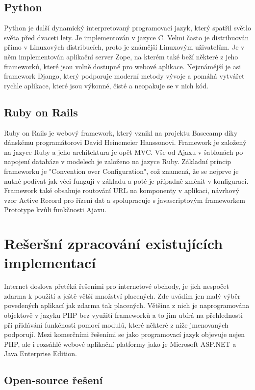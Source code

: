 \documentclass[11pt,twoside,a4paper]{book}
\begin{document}
\subsection{Python}
Python je další dynamický interpretovaný programovací jazyk, který spatřil světlo světa před dvaceti lety. Je implementován v jazyce C. Velmi často je distribuován přímo v Linuxových distribucích, proto je známější Linuxovým uživatelům. Je v něm implementován aplikační server Zope, na kterém také beží některé z jeho frameworků, které jsou volně dostupné pro webové aplikace. Nejznámější je asi framework Django, který podporuje moderní metody vývoje a pomáhá vytvářet rychle aplikace, které jsou výkonné, čisté a neopakuje se v nich kód\cite{wiki:python}.

\subsection{Ruby on Rails}
Ruby on Rails je webový framework, který vznikl na projektu Basecamp díky dánskému programátorovi David Heinemeier Hanssonovi. Framework je založený na jazyce Ruby a jeho architektura je opět MVC. Vše od Ajaxu v šablonách po napojení databáze v modelech je založeno na jazyce Ruby. Základní princip frameworku je "Convention over Configuration", což znamená, že se nejprve je nutné podívat jak věci fungují v základu a poté je případně změnit v konfiguraci. Framework také obsahuje routování URL na komponenty v aplikaci, návrhový vzor Active Record pro řízení dat a spolupracuje s javascriptovým frameworkem Prototype kvůli funkčnosti Ajaxu\cite{wiki:ror}. 

\section{Rešeršní zpracování existujících implementací}

Internet doslova přetéká řešeními pro internetové obchody, je jich nespočet zdarma k použití a ještě větší množství placených. Zde uvádím jen malý výběr povedených aplikací jak zdarma tak placených. Většina z nich je naprogramována objektově v jazyku PHP bez využití frameworků a to jim ubírá na přehlednosti při přidávání funkčnosti pomocí modulů, které některé z níže jmenovaných podporují. Mezi komerčními řešeními se jako programovací jazyk objevuje nejen PHP, ale i rozsáhlé webové aplikační platformy jako je Microsoft ASP.NET a Java Enterprise Edition.

\subsection{Open-source řešení}
\end{document}
